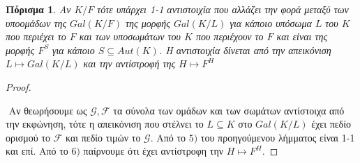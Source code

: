 \documentclass[oneside,a4paper]{article}
\newtheorem{cor}{Πόρισμα}
\begin{document}
\vspace{0.1cm}
\begin{cor} Αν $K/F$ τότε υπάρχει 1-1 αντιστοιχία που αλλάζει την φορά μεταξύ των υποομάδων της $Gal(K/F)$ της μορφής $Gal(K/L)$ για κάποιο υπόσωμα $L$ του $K$ που περιέχει το $F$ και των υποσωμάτων του $K$ που περιέχουν το $F$ και είναι της μορφής $F^S$ για κάποιο $S \subseteq Aut(K)$. Η αντιστοιχία δίνεται από την απεικόνιση $L \mapsto Gal(K/L)$ και την αντίστροφή της $H \mapsto F^H$
\end{cor}
\begin{proof} $ $

	$ $\newline
	Αν θεωρήσουμε ως $\mathcal G, \mathcal F$ τα σύνολα των ομάδων και των σωμάτων αντίστοιχα από την εκφώνηση, τότε η απεικόνιση που στέλνει το $L\subseteq K$ στο $Gal(K/L)$ έχει πεδίο ορισμού το $\mathcal F$ και πεδίο τιμών το $\mathcal G$. Από το $5)$ του προηγούμενου λήμματος είναι 1-1 και επί. Από το $6)$ παίρνουμε ότι έχει αντίστροφη την $H \mapsto F^H$.
	
\end{proof}
\end{document}
